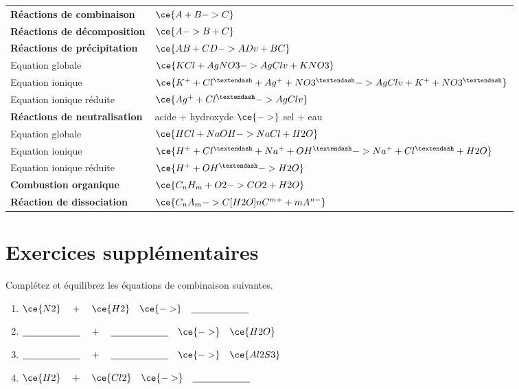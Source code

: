 \documentclass[
  11pt,
  a4paper,
  openany]{book}
\begin{document}
\begin{longtable}[]{@{}
  >{\raggedright\arraybackslash}p{}
  >{\raggedright\arraybackslash}p{}@{}}
\toprule\noalign{}
\endhead
\bottomrule\noalign{}
\endlastfoot
\textbf{Réactions de combinaison} & \(\ce{A + B -> C}\) \\
\textbf{Réactions de décomposition} & \(\ce{A -> B + C}\) \\
\textbf{Réactions de précipitation} & \(\ce{AB + CD -> AD v + BC}\) \\
Equation globale & \(\ce{KCl + AgNO3 -> AgCl v + KNO3}\) \\
Equation ionique & \(\ce{K^{+} + Cl^{–} + Ag^{+} + NO3^{–} -> AgCl v + K^{+} + NO3^{–}}\) \\
Equation ionique réduite & \(\ce{Ag^{+} + Cl^{–} -> AgCl v}\) \\
\textbf{Réactions de neutralisation} & acide + hydroxyde \(\ce{->}\) sel + eau \\
Equation globale & \(\ce{HCl + NaOH -> NaCl + H2O}\) \\
Equation ionique & \(\ce{H^{+} + Cl^{–} + Na^{+} + OH^{–} -> Na^{+} + Cl^{–} + H2O}\) \\
Equation ionique réduite & \(\ce{H^{+} + OH^{–} -> H2O}\) \\
\textbf{Combustion organique} & \(\ce{C_{n}H_{m} + O2 -> CO2 + H2O}\) \\
\textbf{Réaction de dissociation} & \(\ce{C_{n}A_{m} ->C[H2O] n C^{m+} + m A^{n-}}\) \\
\end{longtable}

\newpage

\section{Exercices supplémentaires}\label{exercices-suppluxe9mentaires-9}

\begin{Exercise}

Complétez et équilibrez les équations de combinaison suivantes.

\begin{enumerate}
\def\labelenumi{\arabic{enumi}.}
\item
  \(\ce{N2} \quad + \quad \ce{H2} \quad \ce{->} \quad \underline{\hspace{6em}}\)
\item
  \(\underline{\hspace{6em}} \quad + \quad \underline{\hspace{6em}} \quad \ce{->} \quad \ce{H2O}\)
\item
  \(\underline{\hspace{6em}} \quad + \quad \underline{\hspace{6em}} \quad \ce{->} \quad \ce{Al2S3}\)
\item
  \(\ce{H2} \quad + \quad \ce{Cl2} \quad \ce{->} \quad \underline{\hspace{6em}}\)
\end{enumerate}

\end{Exercise}
\end{document}
